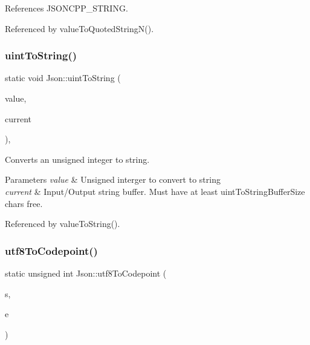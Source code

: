 References J\+S\+O\+N\+C\+P\+P\+\_\+\+S\+T\+R\+I\+NG.



Referenced by value\+To\+Quoted\+String\+N().

\mbox{\label{namespaceJson_ac1ffd21a9e55122014353c773ccc496e_ac1ffd21a9e55122014353c773ccc496e}} 
\subsubsection{\texorpdfstring{uint\+To\+String()}{uintToString()}}
{\footnotesize\ttfamily static void Json\+::uint\+To\+String (\begin{DoxyParamCaption}\item[{\hyperlink{namespaceJson_ae202ecad69725e23443f465e257456d0_ae202ecad69725e23443f465e257456d0}{Largest\+U\+Int}}]{value,  }\item[{char $\ast$\&}]{current }\end{DoxyParamCaption})\hspace{0.3cm}{\ttfamily [inline]}, {\ttfamily [static]}}

Converts an unsigned integer to string. 
\begin{DoxyParams}{Parameters}
{\em value} & Unsigned interger to convert to string \\
\hline
{\em current} & Input/\+Output string buffer. Must have at least uint\+To\+String\+Buffer\+Size chars free. \\
\hline
\end{DoxyParams}


Referenced by value\+To\+String().

\mbox{\label{namespaceJson_a09f2caaead38dd396b21affdf87230ae_a09f2caaead38dd396b21affdf87230ae}} 
\subsubsection{\texorpdfstring{utf8\+To\+Codepoint()}{utf8ToCodepoint()}}
{\footnotesize\ttfamily static unsigned int Json\+::utf8\+To\+Codepoint (\begin{DoxyParamCaption}\item[{const char $\ast$\&}]{s,  }\item[{const char $\ast$}]{e }\end{DoxyParamCaption})\hspace{0.3cm}{\ttfamily [static]}}



